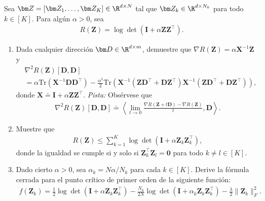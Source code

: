 \documentclass[../../book-main.tex]{subfiles}
\begin{document}
\begin{exercise}
    Sea $\bm Z = [\bm Z_1,\dots,\bm Z_K] \in \R^{d\times N}$ tal que
    $\bm Z_k \in \R^{d\times N_k}$ para todo $k \in [K]$. Para algún
    $\alpha > 0$, sea
    \begin{align*}
        R(\bm Z) = \log\det\left(\bm I + \alpha\bm Z\bm Z^\top \right).
    \end{align*}
    \begin{enumerate}
        \item Dada cualquier dirección $\bm D \in \R^{d\times m}$, demuestre
            que $\nabla R(\bm Z) = \alpha\bm X^{-1}\bm Z$ y
            \begin{align*}
                &\nabla^2 R(\bm Z)[\bm D, \bm D] \\
                &=\alpha \mathrm{Tr}\left( \bm
                X^{-1}\bm D\bm D^\top\right) -
                \frac{\alpha^2}{2}\mathrm{Tr}\left(\bm X^{-1}\left( \bm Z\bm
                    D^\top+\bm D\bm Z^\top\right) \bm X^{-1}\left(
                        \bm Z\bm D^\top+\bm
                D\bm Z^\top\right)\right),
            \end{align*}
            donde $\bm X \doteq \bm I + \alpha\bm Z\bm Z^\top$. {\em
            Pista:} Obsérvese que
            \begin{align*}
                \nabla^2 R(\bm Z)[\bm D, \bm D] \doteq \left\langle \lim_{t
                \to 0} \frac{\nabla R(\bm Z+ t\bm D) - \nabla R(\bm Z)}{t},
                \bm D \right\rangle.
            \end{align*}
        \item
            Muestre que
            \begin{align*}
                R(\bm Z) \le \sum_{k=1}^K \log\det\left(\bm I + \alpha\bm
                Z_k\bm Z_k^\top \right),
            \end{align*}
            donde la igualdad se cumple si y solo si $\bm Z_k^\top\bm Z_l = \bm
            0$ para todo $k \neq l \in [K]$.
        \item Dado cierto $\alpha > 0$, sea $\alpha_k = N\alpha/N_k$ para cada $k
            \in [K]$. Derive la fórmula cerrada para el punto crítico de primer orden
            de la siguiente función:
            \begin{align*}
                f(\bm Z_k) = \frac{1}{2}\log\det\left(\bm I + \alpha\bm
                Z_k\bm Z_k^\top \right) - \frac{N_k}{2N}\log\det\left(\bm I +
                \alpha_k \bm Z_k\bm Z_k^\top \right) -
                \frac{\lambda}{2}\|\bm Z_k\|_F^2.

\end{align*}
\end{enumerate}
\end{exercise}
\end{document}

